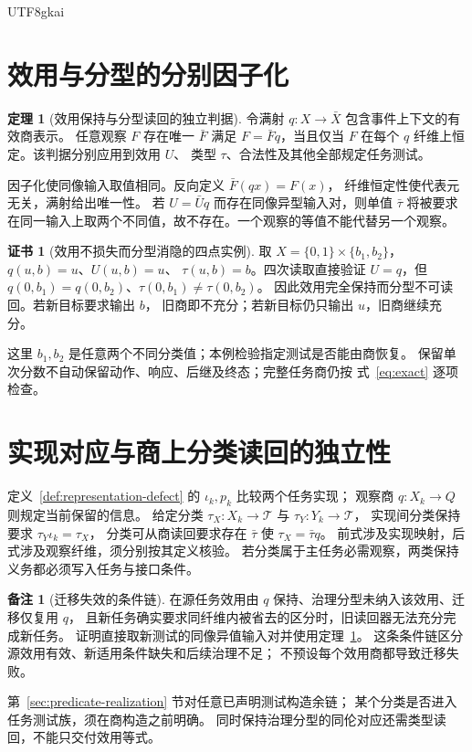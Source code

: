 \documentclass[12pt]{report}
\makeatletter
\theoremstyle{definition}
\newtheorem{theorem}{定理}[chapter]
\newtheorem{remark}{备注}[chapter]
\newtheorem{Certificate}{证书}[chapter]
\renewenvironment{proof}[1][\proofname]{\par
  \pushQED{\qed}\normalfont
  \topsep6\p@\@plus6\p@\relax
  \trivlist
  \item[\hskip\labelsep\normalfont #1\@addpunct{.}]\ignorespaces
}{
  \popQED\endtrivlist\@endpefalse
}
\makeatother
\begin{document}
\begin{CJK*}{UTF8}{gkai}
\section{效用与分型的分别因子化}
\begin{theorem}[效用保持与分型读回的独立判据]
\label{thm:utility-type}
令满射 \(q:X\to\bar X\) 包含事件上下文的有效商表示。
任意观察 \(F\) 存在唯一 \(\bar F\) 满足 \(F=\bar Fq\)，当且仅当
\(F\) 在每个 \(q\) 纤维上恒定。该判据分别应用到效用 \(U\)、
类型 \(\tau\)、合法性及其他全部规定任务测试。
\end{theorem}
\begin{proof}
因子化使同像输入取值相同。反向定义 \(\bar F(qx)=F(x)\)，
纤维恒定性使代表元无关，满射给出唯一性。
若 \(U=\bar Uq\) 而存在同像异型输入对，则单值 \(\bar\tau\) 将被要求
在同一输入上取两个不同值，故不存在。一个观察的等值不能代替另一个观察。
\end{proof}
\begin{Certificate}[效用不损失而分型消隐的四点实例]
取 \(X=\{0,1\}\times\{b_1,b_2\}\)，\(q(u,b)=u\)、\(U(u,b)=u\)、
\(\tau(u,b)=b\)。四次读取直接验证 \(U=q\)，但
\(q(0,b_1)=q(0,b_2)\)、\(\tau(0,b_1)\ne\tau(0,b_2)\)。
因此效用完全保持而分型不可读回。若新目标要求输出 \(b\)，
旧商即不充分；若新目标仍只输出 \(u\)，旧商继续充分。
\end{Certificate}
这里 \(b_1,b_2\) 是任意两个不同分类值；本例检验指定测试是否能由商恢复。
保留单次分数不自动保留动作、响应、后继及终态；完整任务商仍按
式~\eqref{eq:exact} 逐项检查。

\section{实现对应与商上分类读回的独立性}
定义~\ref{def:representation-defect} 的 \(\iota_k,p_k\) 比较两个任务实现；
观察商 \(q:X_k\to Q\) 则规定当前保留的信息。
给定分类 \(\tau_X:X_k\to\mathcal T\) 与 \(\tau_Y:Y_k\to\mathcal T\)，
实现间分类保持要求 \(\tau_Y\iota_k=\tau_X\)，
分类可从商读回要求存在 \(\bar\tau\) 使 \(\tau_X=\bar\tau q\)。
前式涉及实现映射，后式涉及观察纤维，须分别按其定义核验。
若分类属于主任务必需观察，两类保持义务都必须写入任务与接口条件。

\begin{remark}[迁移失效的条件链]
在源任务效用由 \(q\) 保持、治理分型未纳入该效用、迁移仅复用 \(q\)，
且新任务确实要求同纤维内被省去的区分时，旧读回器无法充分完成新任务。
证明直接取新测试的同像异值输入对并使用定理~\ref{thm:utility-type}。
这条条件链区分源效用有效、新适用条件缺失和后续治理不足；
不预设每个效用商都导致迁移失败。
\end{remark}
第~\ref{sec:predicate-realization} 节对任意已声明测试构造余链；
某个分类是否进入任务测试族，须在商构造之前明确。
同时保持治理分型的同伦对应还需类型读回，不能只交付效用等式。


\end{CJK*}
\end{document}
